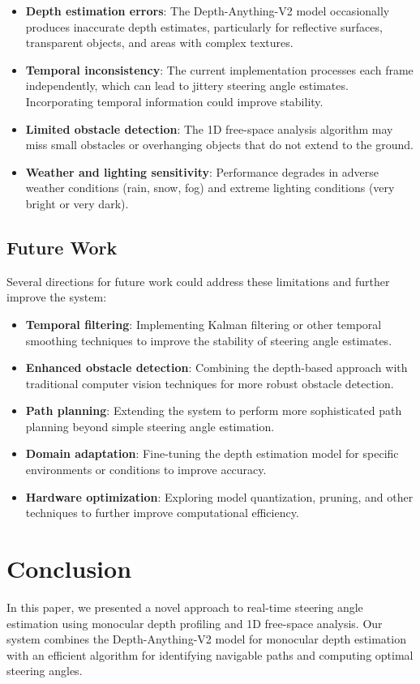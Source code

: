 \documentclass[conference]{IEEEtran}
\begin{document}
\begin{itemize}
\item \textbf{Depth estimation errors}: The Depth-Anything-V2 model occasionally produces inaccurate depth estimates, particularly for reflective surfaces, transparent objects, and areas with complex textures.
\item \textbf{Temporal inconsistency}: The current implementation processes each frame independently, which can lead to jittery steering angle estimates. Incorporating temporal information could improve stability.
\item \textbf{Limited obstacle detection}: The 1D free-space analysis algorithm may miss small obstacles or overhanging objects that do not extend to the ground.
\item \textbf{Weather and lighting sensitivity}: Performance degrades in adverse weather conditions (rain, snow, fog) and extreme lighting conditions (very bright or very dark).
\end{itemize}

\subsection{Future Work}
Several directions for future work could address these limitations and further improve the system:

\begin{itemize}
\item \textbf{Temporal filtering}: Implementing Kalman filtering or other temporal smoothing techniques to improve the stability of steering angle estimates.
\item \textbf{Enhanced obstacle detection}: Combining the depth-based approach with traditional computer vision techniques for more robust obstacle detection.
\item \textbf{Path planning}: Extending the system to perform more sophisticated path planning beyond simple steering angle estimation.
\item \textbf{Domain adaptation}: Fine-tuning the depth estimation model for specific environments or conditions to improve accuracy.
\item \textbf{Hardware optimization}: Exploring model quantization, pruning, and other techniques to further improve computational efficiency.
\end{itemize}

\section{Conclusion}
In this paper, we presented a novel approach to real-time steering angle estimation using monocular depth profiling and 1D free-space analysis. Our system combines the Depth-Anything-V2 model for monocular depth estimation with an efficient algorithm for identifying navigable paths and computing optimal steering angles.
\end{document}
